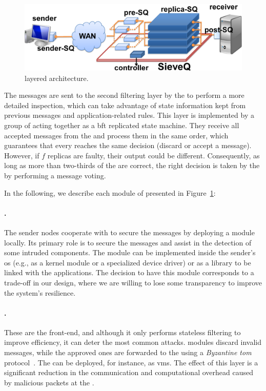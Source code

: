 \begin{figure}[h]
\begin{center}
\includegraphics[width=0.9\columnwidth]{images/images/arch.pdf}
\caption{\sieveq layered architecture.}
\label{fig:arch}
\end{center}
\end{figure}

The messages are sent to the second filtering layer by the \presieve to perform a more detailed inspection, which can take advantage of state information kept from previous messages and application-related rules.
This layer is implemented by a group of \repsieves acting together as a \gls{bft} replicated state machine.
They receive all accepted messages from the \presieves and process them in the same order, which guarantees that every \repsieve reaches the same decision (discard or accept a message).
However, if $f$ replicas are faulty, their output could be different.
Consequently, as long as more than two-thirds of the \repsieves are correct, the right decision is taken by the \postsieve by performing a message voting.

In the following, we describe each module of \sieveq presented in Figure~\ref{fig:arch}:


\paragraph{\Sender.} The sender nodes cooperate with \sieveq to secure the messages by deploying a \sender module locally. 
Its primary role is to secure the messages and assist in the detection of some intruded \sieveq components. 
The module can be implemented inside the sender's \gls{os} (e.g., as a kernel module or a specialized device driver) or as a library to be linked with the applications.
The decision to have this module corresponds to a trade-off in our design, where we are willing to lose some transparency to improve the system's resilience.

\paragraph{\Presieve.}
These are the \sieveq front-end, and although it only performs stateless filtering to improve efficiency, it can deter the most common attacks. 
\Presieve modules discard invalid messages, while the approved ones are forwarded to the \repsieve using a \emph{Byzantine \gls{tom}} protocol~\cite{Bessani:2014}. 
The \presieves can be deployed, for instance, as \glspl{vm}. 
The effect of this layer is a significant reduction in the communication and computational overhead caused by malicious packets at the \repsieve.

